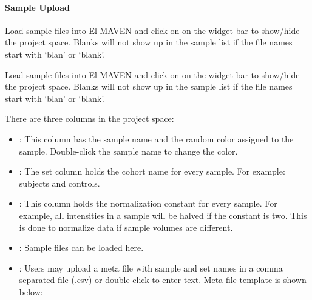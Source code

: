 \documentclass[letterpaper,10pt,english,openany,oneside]{sphinxmanual}
\begin{document}
\paragraph{Sample Upload}
\label{\detokenize{IntroductiontoElMAVENUI:sample-upload}}

Load  sample files into El-MAVEN and click on   on the widget bar to show/hide the project space. Blanks will not show up in the sample list if the file names start with ‘blan’ or ‘blank’.


Load sample files into El-MAVEN and click on  on the widget bar to show/hide the project space. Blanks will not show up in the sample list if the file names start with ‘blan’ or ‘blank’.

There are three columns in the project space:
\begin{itemize}
\item {} 
: This column has the sample name and the random color assigned to the sample. Double-click the sample name to change the color.

\item {} 
: The set column holds the cohort name for every sample. For example: subjects and controls.

\item {} 
: This column holds the normalization constant for every sample. For example, all intensities in a sample will be halved if the constant is two. This is done to normalize data if sample volumes are different.

\end{itemize}

\begin{itemize}
\item {} 
 : Sample files can be loaded here.

\item {} 
 : Users may upload a meta file with sample and set names in a comma separated file (.csv) or double-click to enter text. Meta file template is shown below:

\end{itemize}
\end{document}
